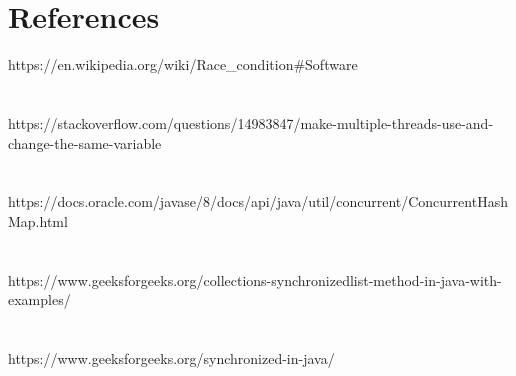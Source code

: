 \documentclass[14pt]{article}
\begin{document}
\section*{References}
\large https://en.wikipedia.org/wiki/Race_condition#Software
\\
\\\vspace{6mm}
\\
https://stackoverflow.com/questions/14983847/make-multiple-threads-use-and-change-the-same-variable
\\
\\\vspace{6mm}
\\
https://docs.oracle.com/javase/8/docs/api/java/util/concurrent/ConcurrentHashMap.html
\\
\\\vspace{6mm}
\\
https://www.geeksforgeeks.org/collections-synchronizedlist-method-in-java-with-examples/
\\
\\\vspace{6mm}
\\
https://www.geeksforgeeks.org/synchronized-in-java/
\end{document}
